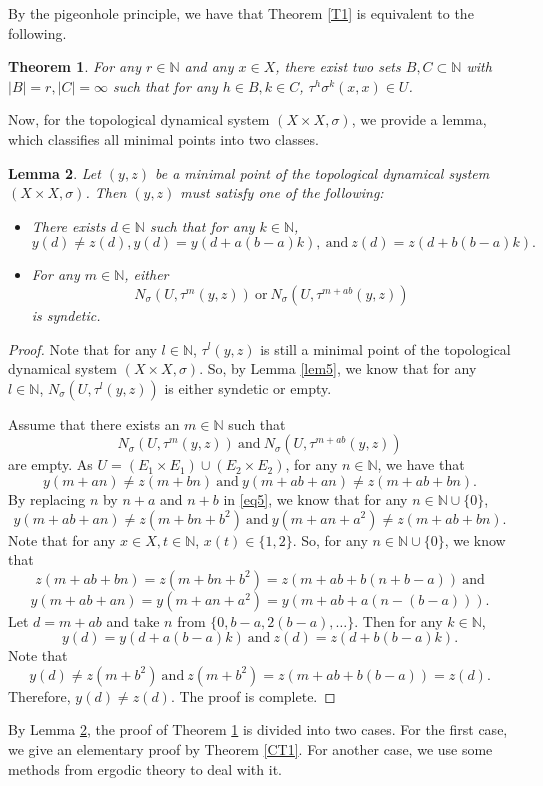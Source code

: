 \documentclass[reqno,12pt]{amsart}
\newtheorem{thm}{Theorem}[section]
\newtheorem{lemma}[thm]{Lemma}
\newtheorem{rem}[thm]{Remark}
\def \N {\mathbb N}
\numberwithin{equation}{section}
\begin{document}
By the pigeonhole principle, we have that Theorem \ref{T1} is equivalent to the following.
\begin{thm}\label{T3-1}
	For any $r\in \N$ and any $x\in X$, there exist two sets $B,C\subset \N$ with $|B|=r,|C|=\infty$  such that for any $h\in B,k\in C$, $\tau^{h}\sigma^{k}(x,x)\in U$.
\end{thm}

Now, for the topological dynamical system $(X\times X,\sigma)$, we provide a lemma, which classifies all minimal points into two classes.
\begin{lemma}\label{lem1}
	Let $(y,z)$ be a minimal point of the topological dynamical system $(X\times X,\sigma)$. Then $(y,z)$ must satisfy one of the following:
	\begin{itemize}
		\item There exists $d\in \N$ such that for any $k\in \N$,
		$$y(d)\neq z(d),y(d)=y(d+a(b-a)k),\ \text{and}\ z(d)=z(d+b(b-a)k).$$
		\item For any $m\in \N$, either $$N_{\sigma}(U,\tau^{m}(y,z))\ \text{or}\ N_{\sigma}(U,\tau^{m+ab}(y,z))$$ is syndetic.
	\end{itemize}
\end{lemma}
\begin{proof}
	Note that for any $l\in \N$, $\tau^{l}(y,z)$ is still a minimal point of the topological dynamical system $(X\times X,\sigma)$. So, by Lemma \ref{lem5}, we know that for any $l\in \N$, $N_{\sigma}(U,\tau^{l}(y,z))$ is either syndetic or empty.
	
	Assume that there exists an $m\in \N$ such that $$N_{\sigma}(U,\tau^{m}(y,z))\ \text{and}\ N_{\sigma}(U,\tau^{m+ab}(y,z))$$ are empty. As $U=(E_1\times E_1)\cup (E_2\times E_2)$, for any $n\in\N$, we have that
	\begin{equation}\label{eq5}
		y(m+an)\neq z(m+bn)\ \text{and}\ y(m+ab+an)\neq z(m+ab+bn).
	\end{equation}
	By replacing $n$ by $n+a$ and $n+b$ in \eqref{eq5}, we know that for any $n\in \N\cup \{0\}$, $$y(m+ab+an)\neq z(m+bn+b^2)\ \text{and}\ y(m+an+a^2)\neq z(m+ab+bn).$$
	Note that for any $x\in X,t\in{\N}$, $x(t)\in\{1,2\}$. So, for any $n\in \N\cup \{0\}$, we know that $$z(m+ab+bn)=z(m+bn+b^2)=z(m+ab+b(n+b-a))\ \text{and}$$ $$y(m+ab+an)=y(m+an+a^2)=y(m+ab+a(n-(b-a))).$$
	Let $d=m+ab$ and take $n$ from $\{0,b-a,2(b-a),\ldots\}$. Then for any $k\in \N$,
	$$y(d)=y(d+a(b-a)k)\ \text{and}\ z(d)=z(d+b(b-a)k).$$ Note that $$y(d)\neq z(m+b^2)\ \text{and}\ z(m+b^2)=z(m+ab+b(b-a))=z(d).$$ Therefore, $y(d)\neq z(d)$. The proof is complete.
\end{proof}
	By Lemma \ref{lem1}, the proof of Theorem \ref{T3-1} is divided into two cases. For the first case, we give an elementary proof by Theorem \ref{CT1}. For another case, we use some methods from ergodic theory to deal with it.
\end{document}
